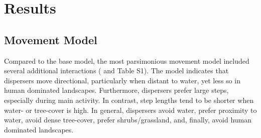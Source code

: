 \documentclass[abstract=on,10pt,a4paper,bibliography=totocnumbered]{article}
\begin{document}

\section{Results}
\subsection{Movement Model}
Compared to the base model, the most parsimonious movement model included
several additional interactions ( and Table S1). The model
indicates that dispersers move directional, particularly when distant to water,
yet less so in human dominated landscapes. Furthermore, dispersers prefer large
steps, especially during main activity. In contrast, step lengths tend to be
shorter when water- or tree-cover is high. In general, dispersers avoid water,
prefer proximity to water, avoid dense tree-cover, prefer shrubs/grassland, and,
finally, avoid human dominated landscapes.
\end{document}
